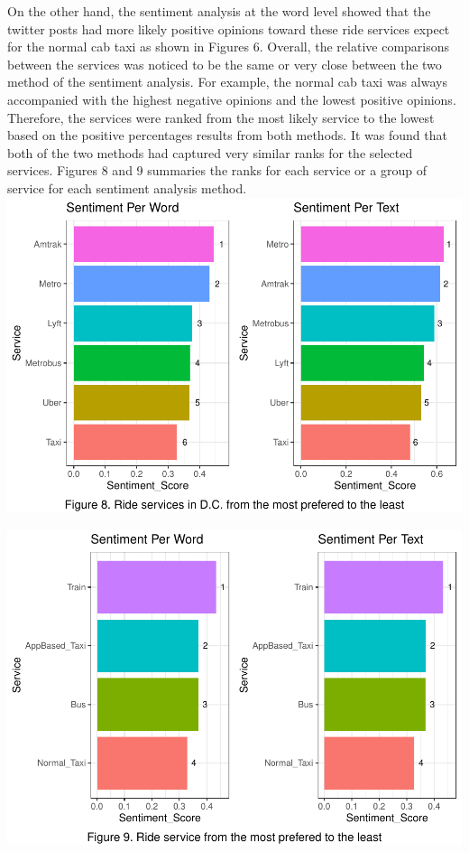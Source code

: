 \documentclass[
  12pt,
]{article}
\begin{document}
On the other hand, the sentiment analysis at the word level showed that
the twitter posts had more likely positive opinions toward these ride
services expect for the normal cab taxi as shown in Figures 6. Overall,
the relative comparisons between the services was noticed to be the same
or very close between the two method of the sentiment analysis. For
example, the normal cab taxi was always accompanied with the highest
negative opinions and the lowest positive opinions. Therefore, the
services were ranked from the most likely service to the lowest based on
the positive percentages results from both methods. It was found that
both of the two methods had captured very similar ranks for the selected
services. Figures 8 and 9 summaries the ranks for each service or a
group of service for each sentiment analysis method.
\includegraphics{Class_Project_Report_files/figure-latex/unnamed-chunk-20-1.pdf}

\includegraphics{Class_Project_Report_files/figure-latex/unnamed-chunk-21-1.pdf}
\end{document}
